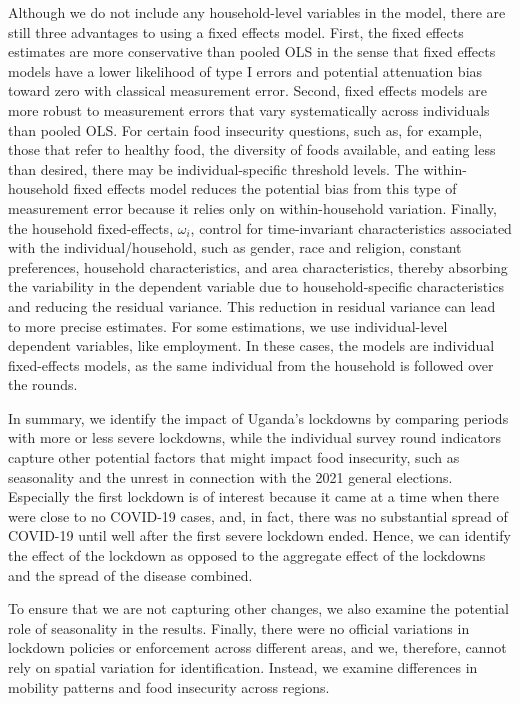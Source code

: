 \documentclass{wber}
\begin{document}
Although we do not include any household-level variables in the model,
there are still three advantages to using a fixed effects model. First,
the fixed effects estimates are more conservative than pooled OLS in the
sense that fixed effects models have a lower likelihood of type I errors
and potential attenuation bias toward zero with classical measurement
error. Second, fixed effects models are more robust to measurement
errors that vary systematically across individuals than pooled OLS. For
certain food insecurity questions, such as, for example, those that
refer to healthy food, the diversity of foods available, and eating less
than desired, there may be individual-specific threshold levels. The
within-household fixed effects model reduces the potential bias from
this type of measurement error because it relies only on
within-household variation. Finally, the household fixed-effects,
\(\omega_i\), control for time-invariant characteristics associated with
the individual/household, such as gender, race and religion, constant
preferences, household characteristics, and area characteristics,
thereby absorbing the variability in the dependent variable due to
household-specific characteristics and reducing the residual variance.
This reduction in residual variance can lead to more precise estimates.
For some estimations, we use individual-level dependent variables, like
employment. In these cases, the models are individual fixed-effects
models, as the same individual from the household is followed over the
rounds.

In summary, we identify the impact of Uganda's lockdowns by comparing
periods with more or less severe lockdowns, while the individual survey
round indicators capture other potential factors that might impact food
insecurity, such as seasonality and the unrest in connection with the
2021 general elections. Especially the first lockdown is of interest
because it came at a time when there were close to no COVID-19 cases,
and, in fact, there was no substantial spread of COVID-19 until well
after the first severe lockdown ended. Hence, we can identify the effect
of the lockdown as opposed to the aggregate effect of the lockdowns and
the spread of the disease combined.

To ensure that we are not capturing other changes, we also examine the
potential role of seasonality in the results. Finally, there were no
official variations in lockdown policies or enforcement across different
areas, and we, therefore, cannot rely on spatial variation for
identification. Instead, we examine differences in mobility patterns and
food insecurity across regions.
\end{document}
